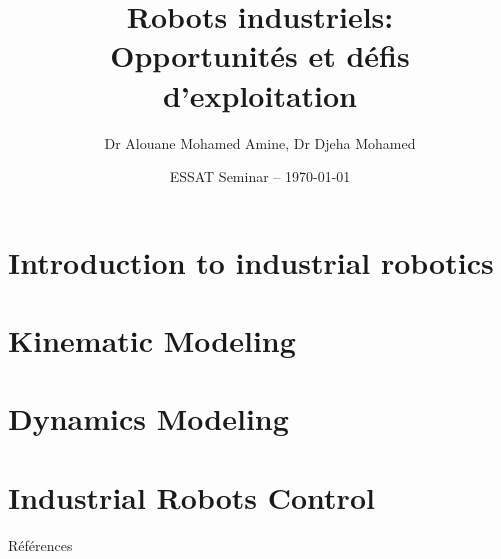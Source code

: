 \documentclass[14pt,aspectratio=169]{beamer}
\title[Introduction à la robotique industrielle]{Robots industriels: \\ Opportunités et défis d'exploitation}
\author[Dr Alouane, Dr Djeha]{Dr Alouane Mohamed Amine, Dr Djeha Mohamed}
\institute[LCSCS]{UER SAI - LCSCS}
\date{ESSAT Seminar -- \today}
\begin{document}
	
\begin{frame}
	\titlepage%
\end{frame}	
\section*{Introduction to industrial robotics}
	
\section{Kinematic Modeling}
	

\section{Dynamics Modeling}%

%
%
\section{Industrial Robots Control}
%


\begin{frame}[allowframebreaks]{Références}
  \footnotesize
  
  
\end{frame}
% 	
%  
\end{document}
